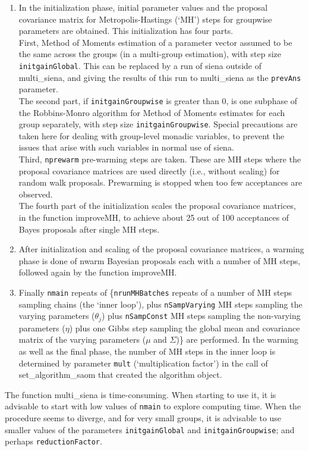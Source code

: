 \documentclass[a4paper,fleqn,11pt]{article}
\newcommand{\+}{\, + \,}
\newcommand{\sfn}[1]{\textsf{#1}}
\begin{document}
  \begin{enumerate}
  \item
  In the initialization phase, initial parameter values and the proposal
  covariance matrix for Metropolis-Hastings (`MH') steps for groupwise parameters
  are obtained.
  This initialization has four parts.\\
  First, Method of Moments estimation of a parameter vector
  assumed to be the same across the groups (in a multi-group estimation),
  with step size \texttt{initgainGlobal}.
  This can be replaced by a run of \textsf{siena} outside of \textsf{multi\_siena},
  and giving the results of this run to \textsf{multi\_siena}
  as the \texttt{prevAns} parameter.\\
  The second part, if \texttt{initgainGroupwise} is greater than 0,
  is one subphase of the Robbins-Monro algorithm for Method of
  Moments estimates for each group separately, with step size
  \texttt{initgainGroupwise}.
  Special precautions are taken here for dealing with group-level monadic variables,
  to prevent the issues that arise with such variables in normal use of \textsf{siena}.\\
  Third, \texttt{nprewarm} pre-warming steps are taken. These are MH steps where the
  proposal covariance matrices are used directly (i.e., without scaling)
  for random walk proposals. Prewarming is stopped when too few
  acceptances are observed.\\
  The fourth part of the initialization scales
  the proposal covariance matrices, in the
  function \sfn{improveMH}, to achieve about 25 out of 100 acceptances of
  Bayes proposals after single MH steps.
  \item
  After initialization and scaling of the proposal covariance matrices,
  a warming phase is done of \sfn{nwarm} Bayesian proposals
  each with a number of MH steps, followed again by the function \sfn{improveMH}.
  \item
  Finally \texttt{nmain} repeats of \Big\{\texttt{nrunMHBatches} repeats of a
  number of MH steps sampling chains (the `inner loop'),
  plus \texttt{nSampVarying} MH steps
  sampling the varying parameters ($\theta_j$) plus \texttt{nSampConst} MH steps
  sampling the non-varying parameters ($\eta$) plus one Gibbs
  step sampling the global mean and covariance matrix of the varying parameters
  ($\mu$ and $\Sigma$)\Big\} are performed.
  In the warming as well as the final phase,
  the number of MH steps in the inner loop is
  determined by parameter \texttt{mult} (`multiplication factor')
  in the call of \textsf{set\_algorithm\_saom} that created the algorithm object.
\end{enumerate}
  The function \textsf{multi\_siena} is time-consuming. When starting to use it, it is advisable
  to start with low values of \texttt{nmain} to explore computing time.
  When the procedure seems to diverge, and for very small groups, it is
  advisable to use smaller values of the parameters \texttt{initgainGlobal}
  and \texttt{initgainGroupwise}; and perhaps \texttt{reductionFactor}.
\end{document}
